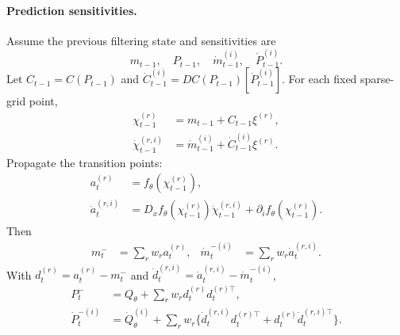 \paragraph{Prediction sensitivities.}
Assume the previous filtering state and sensitivities are
\[
  m_{t-1},\quad P_{t-1},\quad
  \dot m_{t-1}^{(i)},\quad \dot P_{t-1}^{(i)} .
\]
Let \(C_{t-1}=C(P_{t-1})\) and
\(\dot C_{t-1}^{(i)}=DC(P_{t-1})[\dot P_{t-1}^{(i)}]\).  For each fixed
sparse-grid point,
\begin{align}
  \chi_{t-1}^{(r)}&=m_{t-1}+C_{t-1}\xi^{(r)},\\
  \dot\chi_{t-1}^{(r,i)}
  &=
  \dot m_{t-1}^{(i)}+\dot C_{t-1}^{(i)}\xi^{(r)}.
  \label{eq:bf-hd-fsgq-pred-point-score}
\end{align}
Propagate the transition points:
\begin{align}
  a_t^{(r)}&=f_\theta(\chi_{t-1}^{(r)}),\\
  \dot a_t^{(r,i)}
  &=
  D_xf_\theta(\chi_{t-1}^{(r)})\dot\chi_{t-1}^{(r,i)}
  +\partial_i f_\theta(\chi_{t-1}^{(r)}).
  \label{eq:bf-hd-fsgq-transition-score}
\end{align}
Then
\begin{align}
  m_t^-&=\sum_rw_ra_t^{(r)},&
  \dot m_t^{-(i)}&=\sum_rw_r\dot a_t^{(r,i)}.
  \label{eq:bf-hd-fsgq-pred-mean-score}
\end{align}
With \(d_t^{(r)}=a_t^{(r)}-m_t^-\) and
\(\dot d_t^{(r,i)}=\dot a_t^{(r,i)}-\dot m_t^{-(i)}\),
\begin{align}
  P_t^-&=Q_\theta+\sum_rw_rd_t^{(r)}d_t^{(r)\top},\\
  \dot P_t^{-(i)}
  &=
  \dot Q_\theta^{(i)}
  +
  \sum_rw_r
  \{\dot d_t^{(r,i)}d_t^{(r)\top}
  +d_t^{(r)}\dot d_t^{(r,i)\top}\}.
  \label{eq:bf-hd-fsgq-pred-cov-score}
\end{align}

